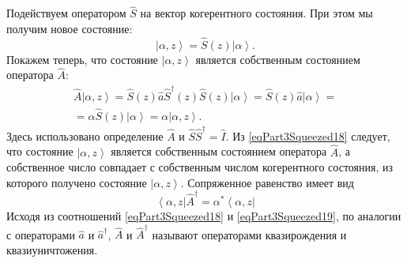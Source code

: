 Подействуем оператором $\hat{S}$ на вектор когерентного состояния. При
этом мы получим новое состояние:
\begin{equation}
\left|\alpha, z\right> = \hat{S}\left(z\right)\left|\alpha\right>.
\label{eqPart3Squeezed17}
\end{equation}
Покажем теперь, что состояние $\left|\alpha, z\right>$ является
собственным состоянием оператора $\hat{A}$:
\begin{eqnarray}
\hat{A}\left|\alpha, z\right> = 
\hat{S}\left(z\right)\hat{a}\hat{S}^{\dag}\left(z\right)\hat{S}\left(z\right)\left|\alpha\right>
= 
\hat{S}\left(z\right)\hat{a}\left|\alpha\right> = 
\nonumber \\
= \alpha \hat{S}\left(z\right)\left|\alpha\right> = 
\alpha \left|\alpha, z\right>.
\label{eqPart3Squeezed18}
\end{eqnarray}
Здесь использовано определение $\hat{A}$ и $\hat{S}\hat{S}^{\dag} = \hat{I}$.
Из \eqref{eqPart3Squeezed18} следует, что состояние $\left|\alpha, z\right>$ является
собственным состоянием оператора $\hat{A}$, а собственное число совпадает с
собственным числом когерентного состояния, из которого получено
состояние $\left|\alpha, z\right>$.
Сопряженное равенство имеет вид
\begin{equation}
\left<\alpha, z\right|\hat{A}^{\dag} = 
\alpha^{*}\left<\alpha, z\right|
\label{eqPart3Squeezed19}
\end{equation}
Исходя из соотношений \eqref{eqPart3Squeezed18} и
\eqref{eqPart3Squeezed19}, по аналогии с операторами $\hat{a}$ и
$\hat{a}^{\dag}$, $\hat{A}$ и $\hat{A}^{\dag}$ называют операторами
квазирождения и квазиуничтожения.

